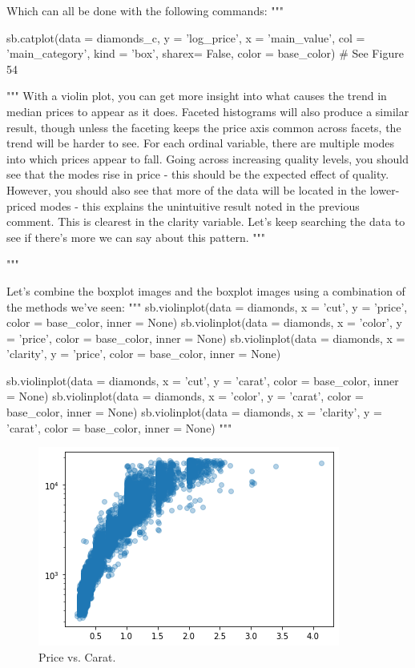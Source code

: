 \begin{python}
	Which can all be done with the following commands:
	"""
	
	
	sb.catplot(data = diamonds_c, y = 'log_price', x = 'main_value', col = 'main_category', kind = 'box', sharex= False, color = base_color)
	# See Figure 54
	
	"""
	With a violin plot, you can get more insight into what causes the trend in median prices to appear as it does. Faceted histograms will also produce a similar result, though unless the faceting keeps the price axis common across facets, the trend will be harder to see. For each ordinal variable, there are multiple modes into which prices appear to fall. Going across increasing quality levels, you should see that the modes rise in price - this should be the expected effect of quality. However, you should also see that more of the data will be located in the lower-priced modes - this explains the unintuitive result noted in the previous comment. This is clearest in the clarity variable. Let's keep searching the data to see if there's more we can say about this pattern.
	"""
	
	"""
	
	Let's combine the boxplot images and the boxplot images using a combination of the methods we've seen:
	"""
	sb.violinplot(data = diamonds, x = 'cut', y = 'price', color = base_color, inner = None)
	sb.violinplot(data = diamonds, x = 'color', y = 'price', color = base_color, inner = None)
	sb.violinplot(data = diamonds, x = 'clarity', y = 'price', color = base_color, inner = None)
	
	sb.violinplot(data = diamonds, x = 'cut', y = 'carat', color = base_color, inner = None)
	sb.violinplot(data = diamonds, x = 'color', y = 'carat', color = base_color, inner = None)
	sb.violinplot(data = diamonds, x = 'clarity', y = 'carat', color = base_color, inner = None)
	"""
	
	
	
\end{python}

\begin{figure}
	\includegraphics{images/figure51.png}
	\caption{Price vs. Carat.}\label{fig:figure51}
\end{figure}

